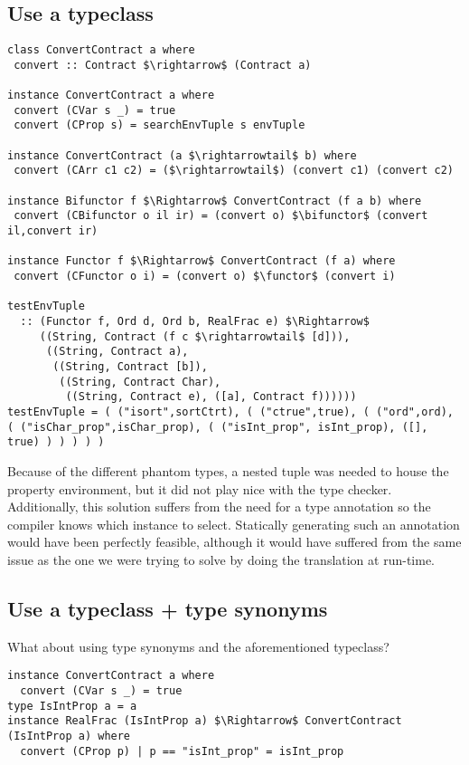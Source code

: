\documentclass[10pt]{report}
\makeatletter
\newcommand{\functor}{<\!\!\!@\!\!\!>}
\newcommand{\bifunctor}{<\!\!\!@\!\!@\!\!\!>}
\makeatother
\begin{document}
\subsection{Use a typeclass}

\begin{lstlisting}[caption=Attempt at using a typeclass to recover the extra type information.,mathescape]
class ConvertContract a where
 convert :: Contract $\rightarrow$ (Contract a)

instance ConvertContract a where
 convert (CVar s _) = true
 convert (CProp s) = searchEnvTuple s envTuple

instance ConvertContract (a $\rightarrowtail$ b) where
 convert (CArr c1 c2) = ($\rightarrowtail$) (convert c1) (convert c2)

instance Bifunctor f $\Rightarrow$ ConvertContract (f a b) where
 convert (CBifunctor o il ir) = (convert o) $\bifunctor$ (convert il,convert ir)

instance Functor f $\Rightarrow$ ConvertContract (f a) where
 convert (CFunctor o i) = (convert o) $\functor$ (convert i)
 
testEnvTuple
  :: (Functor f, Ord d, Ord b, RealFrac e) $\Rightarrow$
     ((String, Contract (f c $\rightarrowtail$ [d])),
      ((String, Contract a),
       ((String, Contract [b]),
        ((String, Contract Char),
         ((String, Contract e), ([a], Contract f))))))
testEnvTuple = ( ("isort",sortCtrt), ( ("ctrue",true), ( ("ord",ord), ( ("isChar_prop",isChar_prop), ( ("isInt_prop", isInt_prop), ([], true) ) ) ) ) )
\end{lstlisting}

Because of the different phantom types, a nested tuple was needed to house the property environment, but it did not play nice with the type checker.
Additionally, this solution suffers from the need for a type annotation so the compiler knows which instance to select.
Statically generating such an annotation would have been perfectly feasible, although it would have suffered from the same issue as the one we were trying to solve by doing the translation at run-time.

\subsection{Use a typeclass + type synonyms}
What about using type synonyms and the aforementioned typeclass?

\begin{lstlisting}[caption=Attempt at using type synonyms to choose the correct instances.]
instance ConvertContract a where
  convert (CVar s _) = true
type IsIntProp a = a
instance RealFrac (IsIntProp a) $\Rightarrow$ ConvertContract (IsIntProp a) where
  convert (CProp p) | p == "isInt_prop" = isInt_prop
\end{lstlisting}
\end{document}
